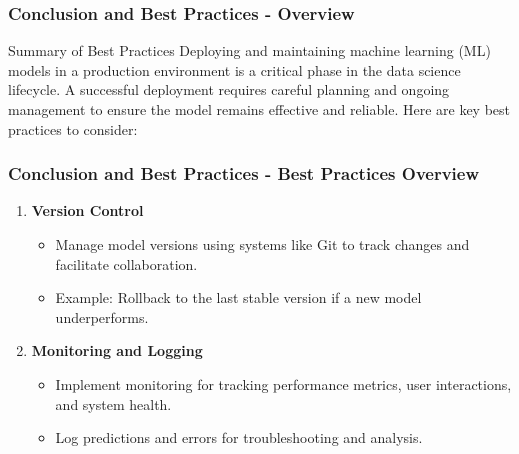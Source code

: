 \documentclass[aspectratio=169]{beamer}
\begin{document}
\begin{frame}[fragile]
    \frametitle{Conclusion and Best Practices - Overview}
    \begin{block}{Summary of Best Practices}
        Deploying and maintaining machine learning (ML) models in a production environment is a critical phase in the data science lifecycle. A successful deployment requires careful planning and ongoing management to ensure the model remains effective and reliable. Here are key best practices to consider:
    \end{block}
\end{frame}

\begin{frame}[fragile]
    \frametitle{Conclusion and Best Practices - Best Practices Overview}
    \begin{enumerate}
        \item \textbf{Version Control}
        \begin{itemize}
            \item Manage model versions using systems like Git to track changes and facilitate collaboration.
            \item Example: Rollback to the last stable version if a new model underperforms.
        \end{itemize}
        
        \item \textbf{Monitoring and Logging}
        \begin{itemize}
            \item Implement monitoring for tracking performance metrics, user interactions, and system health.
            \item Log predictions and errors for troubleshooting and analysis.
        \end{itemize}
    \end{enumerate}
\end{frame}
\end{document}
